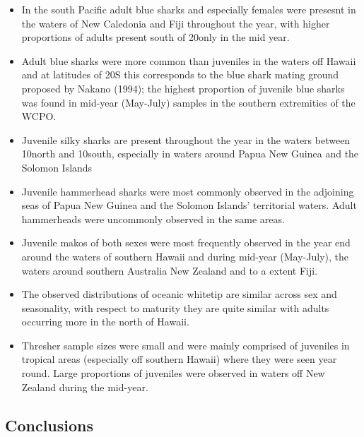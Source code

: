\documentclass[12pt]{SCreport}
\begin{document}
 
\begin{itemize}
  \item In the south Pacific adult blue sharks and especially females were presesnt in the waters of New Caledonia and Fiji throughout the year, with higher proportions of adults present south of 20\degree only in the mid year. 
  \item Adult blue sharks were more common than juveniles in the waters off Hawaii and at latitudes of 20\degree S this corresponds to the blue shark mating ground proposed by Nakano (1994); the highest proportion of juvenile blue sharks was found in mid-year (May-July) samples in the southern extremities of the WCPO.
  \item  Juvenile silky sharks are present throughout the year in the waters between 10\degree north and 10\degree south, especially in waters around Papua New Guinea and the Solomon Islands
\item Juvenile hammerhead sharks were most commonly observed in the adjoining seas of Papua New Guinea and the Solomon Islands' territorial waters.    Adult hammerheads were uncommonly observed in the same areas.  

\item Juvenile makos of both sexes were most frequently observed in the year end around the waters of southern Hawaii and during  mid-year (May-July), the waters around southern Australia New Zealand and to a extent Fiji.  

\item The observed distributions of oceanic whitetip are similar across sex and seasonality, with respect to maturity they are quite similar with adults occurring more in the north of Hawaii.

\item Thresher sample sizes were small and were mainly comprised of juveniles in tropical areas (especially off southern Hawaii) where they were seen year round. Large proportions of juveniles were observed in waters off New Zealand during the mid-year.
\end{itemize}

            
\subsection{Conclusions}
\end{document}
